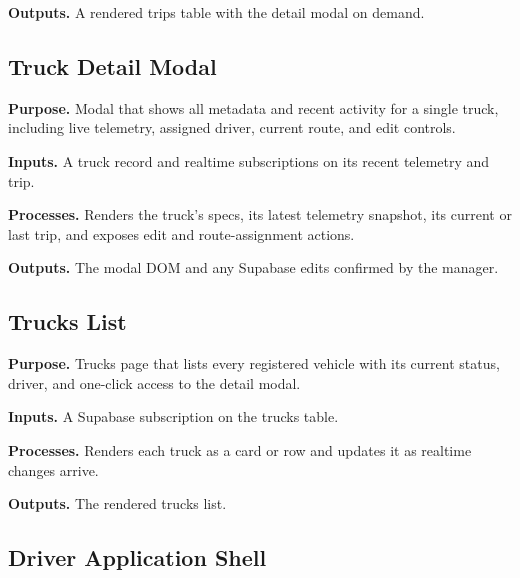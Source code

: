 \noindent\textbf{Outputs.} A rendered trips table with the detail modal on demand.



\subsection{Truck Detail Modal}
\label{sec:code_frontend_truckdetail}

\noindent\textbf{Purpose.} Modal that shows all metadata and recent activity for a single truck, including live telemetry, assigned driver, current route, and edit controls.

\noindent\textbf{Inputs.} A truck record and realtime subscriptions on its recent telemetry and trip.

\noindent\textbf{Processes.} Renders the truck's specs, its latest telemetry snapshot, its current or last trip, and exposes edit and route-assignment actions.

\noindent\textbf{Outputs.} The modal DOM and any Supabase edits confirmed by the manager.



\subsection{Trucks List}
\label{sec:code_frontend_trucks}

\noindent\textbf{Purpose.} Trucks page that lists every registered vehicle with its current status, driver, and one-click access to the detail modal.

\noindent\textbf{Inputs.} A Supabase subscription on the trucks table.

\noindent\textbf{Processes.} Renders each truck as a card or row and updates it as realtime changes arrive.

\noindent\textbf{Outputs.} The rendered trucks list.



\subsection{Driver Application Shell}
\label{sec:code_frontend_driver_app}

